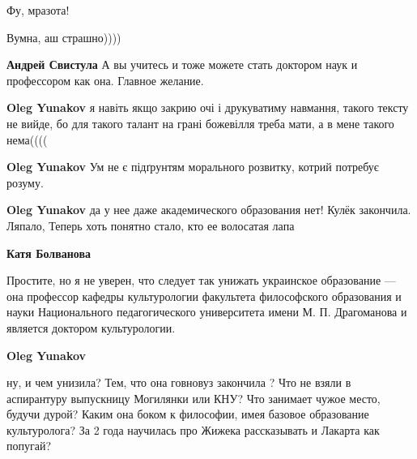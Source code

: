 \begin{itemize}
Фу, мразота!


Вумна, аш страшно))))

\begin{itemize}

\textbf{Андрей Свистула} А вы учитесь и тоже можете стать доктором наук и профессором как она. Главное желание.


\textbf{Oleg Yunakov} я навіть якщо закрию очі і друкуватиму навмання, такого тексту не вийде, бо для такого талант на грані божевілля треба мати, а в мене такого нема((((


\textbf{Oleg Yunakov}
Ум не є підґрунтям морального розвитку, котрий потребує розуму.


\textbf{Oleg Yunakov} да у нее даже академического образования нет! Кулёк закончила. Ляпало, Теперь хоть понятно стало, кто ее волосатая лапа


\textbf{Катя Болванова} 

Простите, но я не уверен, что следует так унижать украинское образование — она
профессор кафедры культурологии факультета философского образования и науки
Национального педагогического университета имени М. П. Драгоманова и является
доктором культурологии.


\textbf{Oleg Yunakov} 

ну, и чем унизила? Тем, что она говновуз закончила ? Что
не взяли в аспирантуру выпускницу Могилянки или КНУ? Что занимает чужое место,
будучи дурой? Каким она боком к философии, имея базовое образование
культуролога? За 2 года научилась про Жижека рассказывать и Лакарта как
попугай?


\end{itemize}
\end{itemize}
